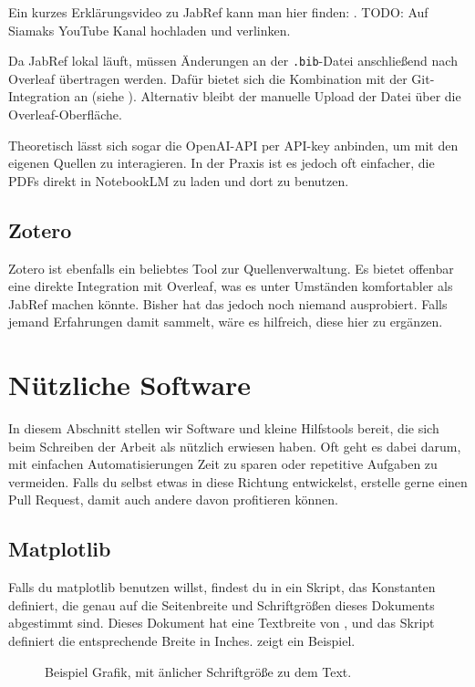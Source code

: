 Ein kurzes Erklärungsvideo zu JabRef kann man hier finden: . 
TODO: Auf Siamaks YouTube Kanal hochladen und verlinken. 

Da JabRef lokal läuft, müssen Änderungen an der \texttt{.bib}-Datei anschließend nach Overleaf übertragen werden. Dafür bietet sich die Kombination mit der Git-Integration an (siehe ). Alternativ bleibt der manuelle Upload der Datei über die Overleaf-Oberfläche.

Theoretisch lässt sich sogar die OpenAI-API per API-key anbinden, um mit den eigenen Quellen zu interagieren. In der Praxis ist es jedoch oft einfacher, die PDFs direkt in NotebookLM zu laden und dort zu benutzen.

\subsection{Zotero}
Zotero ist ebenfalls ein beliebtes Tool zur Quellenverwaltung. Es bietet offenbar eine direkte Integration mit Overleaf, was es unter Umständen komfortabler als JabRef machen könnte. Bisher hat das jedoch noch niemand ausprobiert. Falls jemand Erfahrungen damit sammelt, wäre es hilfreich, diese hier zu ergänzen.

\section{Nützliche Software}

In diesem Abschnitt stellen wir Software und kleine Hilfstools bereit, die sich beim Schreiben der Arbeit als nützlich erwiesen haben. Oft geht es dabei darum, mit einfachen Automatisierungen Zeit zu sparen oder repetitive Aufgaben zu vermeiden. Falls du selbst etwas in diese Richtung entwickelst, erstelle gerne einen Pull Request, damit auch andere davon profitieren können.

\subsection{Matplotlib}
Falls du matplotlib benutzen willst, findest du in  ein Skript, das Konstanten definiert, die genau auf die Seitenbreite und Schriftgrößen dieses Dokuments abgestimmt sind. Dieses Dokument hat eine Textbreite von \the\linewidth, und das Skript definiert die entsprechende Breite in Inches.  zeigt ein Beispiel.

\label{subsec:grafiken}
  \begin{figure}[H]                                       
      \centering
      
      \caption{Beispiel Grafik, mit änlicher Schriftgröße zu dem Text.}
      \label{fig:test_figure}                                     
  \end{figure}        

